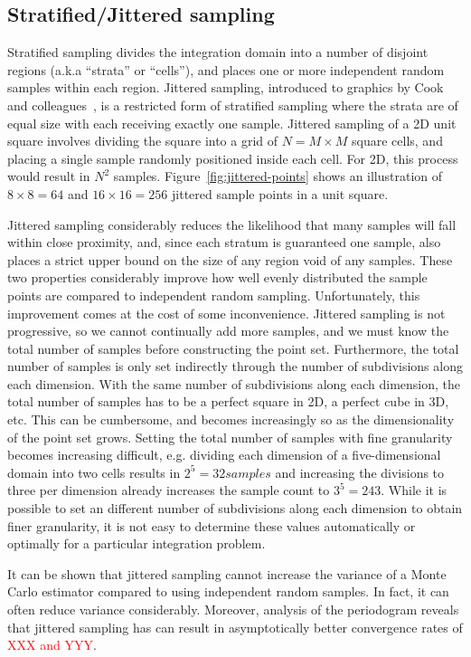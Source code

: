 \documentclass[11pt,fleqn]{book} %
\begin{document}
\subsection{Stratified/Jittered sampling}
Stratified sampling divides the integration domain into a number of disjoint regions (a.k.a ``strata'' or ``cells''), and places one or more independent random samples within each region. Jittered sampling, introduced to graphics by Cook and colleagues~\cite{Cook:1986:SSC}, is a restricted form of stratified sampling where the strata are of equal size with each receiving exactly one sample. Jittered sampling of a 2D unit square involves dividing the square into a grid of $N = M\times M$ square cells, and placing a single sample randomly positioned inside each cell. For 2D, this process would result in $N^2$ samples. Figure~\ref{fig:jittered-points} shows an illustration of $8\times8 =64$ and $16\times16 = 256$ jittered sample points in a unit square.


Jittered sampling considerably reduces the likelihood that many samples will fall within close proximity, and, since each stratum is guaranteed one sample, also places a strict upper bound on the size of any region void of any samples. These two properties considerably improve how well evenly distributed the sample points are compared to independent random sampling. Unfortunately, this improvement comes at the cost of some inconvenience. Jittered sampling is not progressive, so we cannot continually add more samples, and we must know the total number of samples before constructing the point set. Furthermore, the total number of samples is only set indirectly through the number of subdivisions along each dimension. With the same number of subdivisions along each dimension, the total number of samples has to be a perfect square in 2D, a perfect cube in 3D, etc. This can be cumbersome, and becomes increasingly so as the dimensionality of the point set grows. Setting the total number of samples with fine granularity becomes increasing difficult, e.g. dividing each dimension of a five-dimensional domain into two cells results in $2^5 = 32 samples$ and increasing the divisions to three per dimension already increases the sample count to $3^5 = 243$. While it is possible to set an different number of subdivisions along each dimension to obtain finer granularity, it is not easy to determine these values automatically or optimally for a particular integration problem.

It can be shown that jittered sampling cannot increase the variance of a Monte Carlo estimator compared to using independent random samples. In fact, it can often reduce variance considerably. Moreover, analysis of the periodogram reveals that jittered sampling has can result in asymptotically better convergence rates of \textcolor{red}{XXX and YYY}.
%
%
%
\end{document}
